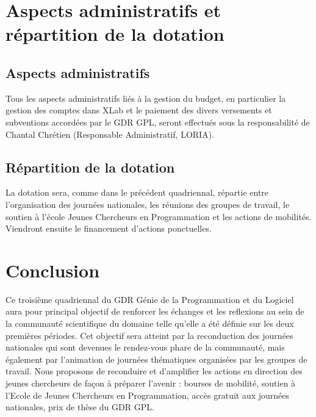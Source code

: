 \documentclass[11pt]{article}
\begin{document}



\section{Aspects administratifs et répartition de la dotation}\label{budget}

\subsection{Aspects administratifs}

Tous les aspects administratifs liés à la gestion du budget, en particulier la
gestion des comptes dans XLab et le paiement des divers versements et
subventions accordées par le GDR GPL, seront effectués sous la responsabilité
de Chantal Chrétien (Responsable Administratif, LORIA).  

\subsection{Répartition de la dotation}

La dotation sera, comme dans le précédent quadriennal, répartie entre l'organisation des journées nationales, les réunions des groupes de travail, le soutien à l'école Jeunes Chercheurs en Programmation et les actions de mobilités. Viendront ensuite le financement d'actions ponctuelles.

\section{Conclusion}\label{conclusion}

Ce troisième quadriennal du GDR Génie de la Programmation et du Logiciel aura
pour principal objectif de renforcer les échanges et les reflexions au sein de
la communauté scientifique du domaine telle qu'elle a été définie sur les deux
premières périodes. 
Cet objectif sera atteint par la reconduction des journées nationales qui sont
devenues le rendez-vous phare de la communauté, mais également par l'animation
de journées thématiques organisées par les groupes de travail. Nous proposons
de reconduire et d'amplifier les actions en direction des jeunes chercheurs de
façon à préparer l'avenir : bourses de mobilité, soutien à l'Ecole de Jeunes
Chercheurs en Programmation, accès gratuit aux journées nationales, prix de
thèse du GDR GPL.
\end{document}
